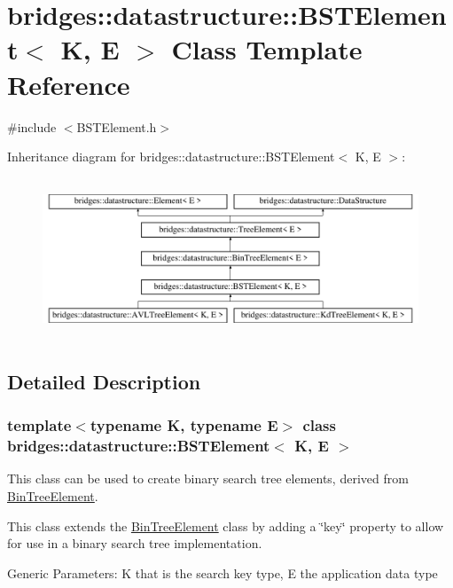 \hypertarget{classbridges_1_1datastructure_1_1_b_s_t_element}{}\section{bridges\+:\+:datastructure\+:\+:B\+S\+T\+Element$<$ K, E $>$ Class Template Reference}
\label{classbridges_1_1datastructure_1_1_b_s_t_element}


{\ttfamily \#include $<$B\+S\+T\+Element.\+h$>$}

Inheritance diagram for bridges\+:\+:datastructure\+:\+:B\+S\+T\+Element$<$ K, E $>$\+:\begin{figure}[H]
\begin{center}
\leavevmode
\includegraphics[height=4.794520cm]{classbridges_1_1datastructure_1_1_b_s_t_element}
\end{center}
\end{figure}


\subsection{Detailed Description}
\subsubsection*{template$<$typename K, typename E$>$\newline
class bridges\+::datastructure\+::\+B\+S\+T\+Element$<$ K, E $>$}

This class can be used to create binary search tree elements, derived from \hyperlink{classbridges_1_1datastructure_1_1_bin_tree_element}{Bin\+Tree\+Element}. 

This class extends the \hyperlink{classbridges_1_1datastructure_1_1_bin_tree_element}{Bin\+Tree\+Element} class by adding a \char`\"{}key\char`\"{} property to allow for use in a binary search tree implementation.

Generic Parameters\+: K that is the search key type, E the application data type

